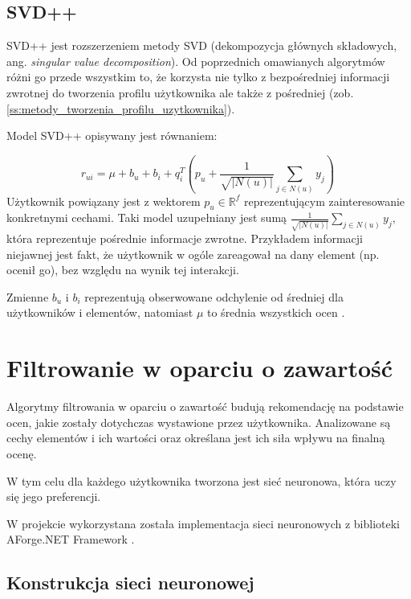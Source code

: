\documentclass[twoside]{iisthesis}
\begin{document}
		 \subsection{SVD++}
		 
		 SVD++ jest rozszerzeniem metody SVD (dekompozycja głównych składowych, ang. \textit{singular value decomposition}). Od poprzednich omawianych algorytmów różni go przede wszystkim to, że korzysta nie tylko z bezpośredniej informacji zwrotnej do tworzenia profilu użytkownika ale także z pośredniej (zob. \ref{ss:metody_tworzenia_profilu_uzytkownika}).
		 
		 Model SVD++ opisywany jest równaniem:
		 
		 \begin{equation}
		 	\label{eq:svd}
		 	r_{ui} = \mu + b_u + b_i + q_i^T (p_u + \frac{1}{\sqrt{|N(u)|}} \sum_{j \in N(u)}^{} y_j) 
		 	\,
		 \end{equation}		 		 
		 Użytkownik powiązany jest z wektorem $p_u \in \mathbb{R} ^f$ reprezentującym zainteresowanie konkretnymi cechami. Taki model uzupełniany jest sumą  $\frac{1}{\sqrt{|N(u)|}} \sum_{j \in N(u)}^{} y_j$, która reprezentuje pośrednie informacje zwrotne. Przykładem informacji niejawnej jest fakt, że użytkownik w ogóle zareagował na dany element (np. ocenił go), bez względu na wynik tej interakcji. 
		  
		 Zmienne $b_u$ i $b_i$ reprezentują obserwowane odchylenie od średniej dla użytkowników i elementów, natomiast $\mu$ to średnia wszystkich ocen \cite{koren2008factorization}. 
		 	 
		 
	 \section{Filtrowanie w oparciu o zawartość}
	 
	 
		 Algorytmy filtrowania w oparciu o zawartość budują rekomendację na podstawie ocen, jakie zostały dotychczas wystawione przez użytkownika. Analizowane są cechy elementów i ich wartości oraz określana jest ich siła wpływu na finalną ocenę. 
		 
		 W tym celu dla każdego użytkownika tworzona jest sieć neuronowa, która uczy się jego preferencji. 
		 
		 W projekcie wykorzystana została implementacja sieci neuronowych z biblioteki AForge.NET Framework \cite{aforgenet}.
	 
		 \subsection{Konstrukcja sieci neuronowej}
		 
\end{document}
